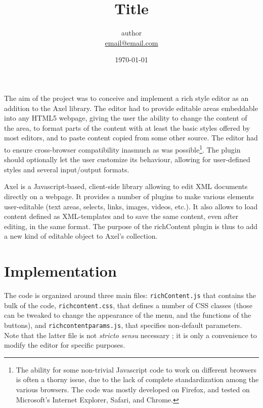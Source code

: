 \documentclass[11pt,a4paper]{article}
\begin{document}
\title{Title}
\author{author\\
   \url{email@email.com}}
\date{\today}
 
\maketitle

The aim of the project was to conceive and implement a rich style editor as an addition to the Axel library. The editor had to provide editable areas embeddable into any HTML5 webpage, giving the user the ability to change the content of the area, to format parts of the content with at least the basic styles offered by most editors, and to paste content copied from some other source. The editor had to ensure cross-browser compatibility inasmuch as was possible\footnote{The ability for some non-trivial Javascript code to work on different browsers is often a thorny issue, due to the lack of complete standardization among the various browsers. The code was mostly developed on Firefox, and tested on Microsoft's Internet Explorer, Safari, and Chrome.}. The plugin should optionally let the user customize its behaviour, allowing for user-defined styles and several input/output formats. 



Axel is a Javascript-based, client-side library allowing to edit XML documents directly on a webpage. It provides a number of plugins to make various elements user-editable (text areas, selects, links, images, videos, etc.). It also allows to load content defined as XML-templates and to save the same content, even after editing, in the same format. The purpose of the richContent plugin is thus to add a new kind of editable object to Axel's collection.

\section{Implementation}

The code is organized around three main files: \texttt{richContent.js} that contains the bulk of the code, \texttt{richcontent.css}, that defines a number of CSS classes (those can be tweaked to change the appearance of the menu, and the functions of the buttons), and \texttt{richcontentparams.js}, that specifies non-default parameters. Note that the latter file is not \emph{stricto sensu} necessary ; it is only a convenience to modify the editor for specific purposes.
\end{document}
